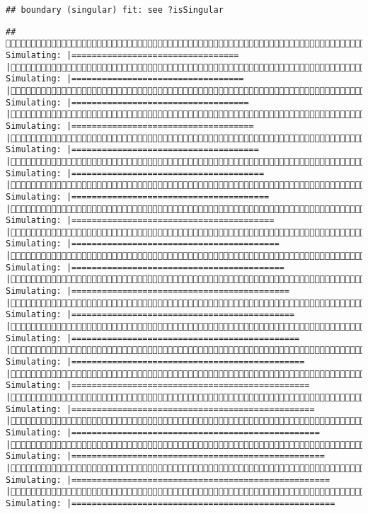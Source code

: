 \documentclass[]{article}
\begin{document}
\begin{verbatim}
## boundary (singular) fit: see ?isSingular
\end{verbatim}

\begin{verbatim}
## (2/4) Simulating: |=================================                      |(2/4) Simulating: |==================================                     |(2/4) Simulating: |===================================                    |(2/4) Simulating: |====================================                   |(2/4) Simulating: |=====================================                  |(2/4) Simulating: |======================================                 |(2/4) Simulating: |=======================================                |(2/4) Simulating: |========================================               |(2/4) Simulating: |=========================================              |(2/4) Simulating: |==========================================             |(2/4) Simulating: |===========================================            |(2/4) Simulating: |============================================           |(2/4) Simulating: |=============================================          |(2/4) Simulating: |==============================================         |(2/4) Simulating: |===============================================        |(2/4) Simulating: |================================================       |(2/4) Simulating: |=================================================      |(2/4) Simulating: |==================================================     |(2/4) Simulating: |===================================================    |(2/4) Simulating: |====================================================   
\end{verbatim}
\end{document}
